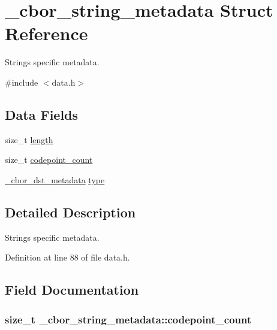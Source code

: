 \hypertarget{struct__cbor__string__metadata}{\section{\-\_\-cbor\-\_\-string\-\_\-metadata Struct Reference}
\label{struct__cbor__string__metadata}
}


Strings specific metadata.  




{\ttfamily \#include $<$data.\-h$>$}

\subsection*{Data Fields}
\begin{DoxyCompactItemize}
\item 
size\-\_\-t \hyperlink{struct__cbor__string__metadata_a558805df7c655cfaf3c289bc536ff96e}{length}
\item 
size\-\_\-t \hyperlink{struct__cbor__string__metadata_a07f2e49bd1cd40ba2277ae6d7a9b6d5d}{codepoint\-\_\-count}
\item 
\hyperlink{data_8h_a3cdab5e05cf46846e98b43cf77985589}{\-\_\-cbor\-\_\-dst\-\_\-metadata} \hyperlink{struct__cbor__string__metadata_afcfdf5e250b677a7e88c5b9c1919bc1a}{type}
\end{DoxyCompactItemize}


\subsection{Detailed Description}
Strings specific metadata. 

Definition at line 88 of file data.\-h.



\subsection{Field Documentation}
\hypertarget{struct__cbor__string__metadata_a07f2e49bd1cd40ba2277ae6d7a9b6d5d}{
\subsubsection[{codepoint\-\_\-count}]{\setlength{\rightskip}{0pt plus 5cm}size\-\_\-t \-\_\-cbor\-\_\-string\-\_\-metadata\-::codepoint\-\_\-count}}\label{struct__cbor__string__metadata_a07f2e49bd1cd40ba2277ae6d7a9b6d5d}


